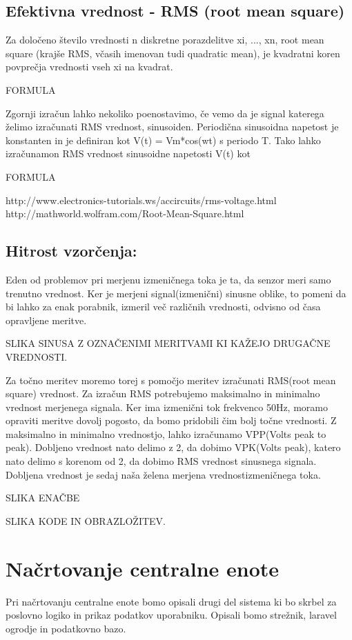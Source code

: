 \documentclass[12pt,a4paper,titlepage,openany]{report}
\begin{document}
\subsection{Efektivna vrednost - RMS (root mean square)}

Za določeno število vrednosti n diskretne porazdelitve xi, ..., xn, root mean square (krajše RMS, včasih imenovan tudi
quadratic mean), je kvadratni koren povprečja vrednosti vseh xi na kvadrat.

FORMULA

Zgornji izračun lahko nekoliko poenostavimo, če vemo da je signal katerega želimo izračunati RMS vrednost, sinusoiden.
Periodična sinusoidna napetost je konstanten in je definiran kot V(t) = Vm*cos(wt) s periodo T. Tako lahko izračunamon RMS
vrednost sinusoidne napetosti V(t) kot

FORMULA

http://www.electronics-tutorials.ws/accircuits/rms-voltage.html
http://mathworld.wolfram.com/Root-Mean-Square.html


\subsection{Hitrost vzorčenja:}
Eden od problemov pri merjenu izmeničnega toka je ta, da senzor meri samo trenutno vrednost. Ker je merjeni signal(izmenični) sinusne oblike, to pomeni da bi lahko za enak porabnik, izmeril več različnih vrednosti, odvisno od časa opravljene meritve.

SLIKA SINUSA Z OZNAČENIMI MERITVAMI KI KAŽEJO DRUGAČNE VREDNOSTI.

Za točno meritev moremo torej s pomočjo meritev izračunati RMS(root mean square) vrednost. Za izračun RMS potrebujemo maksimalno in minimalno vrednost merjenega signala. Ker ima izmenični tok frekvenco 50Hz, moramo opraviti meritve dovolj pogosto, da bomo pridobili čim bolj točne vrednosti. Z maksimalno in minimalno vrednostjo, lahko izračunamo VPP(Volts peak to peak). Dobljeno vrednost nato delimo z 2, da dobimo VPK(Volts peak), katero nato delimo s korenom od 2, da dobimo RMS vrednost sinusnega signala. Dobljena vrednost je sedaj naša želena merjena vrednostizmeničnega toka.

SLIKA ENAČBE

SLIKA KODE IN OBRAZLOŽITEV.


\section{Načrtovanje centralne enote}
\thispagestyle{fancy}
Pri načrtovanju centralne enote bomo opisali drugi del sistema ki bo skrbel za poslovno logiko in prikaz podatkov uporabniku. Opisali bomo strežnik, laravel ogrodje in podatkovno bazo.
\end{document}
